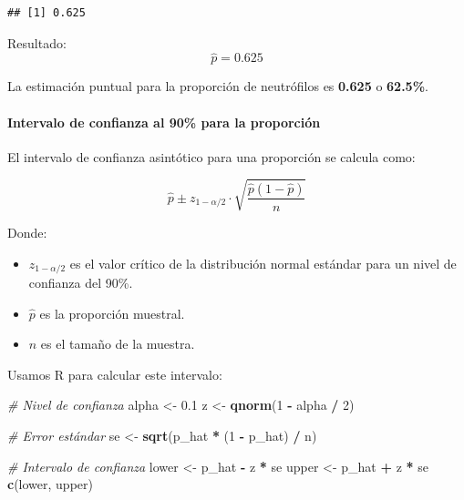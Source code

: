\documentclass[
]{article}
\newenvironment{Shaded}{\begin{snugshade}}{\end{snugshade}}
\newcommand{\CommentTok}[1]{\textcolor[rgb]{0.56,0.35,0.01}{\textit{#1}}}
\newcommand{\DecValTok}[1]{\textcolor[rgb]{0.00,0.00,0.81}{#1}}
\newcommand{\FloatTok}[1]{\textcolor[rgb]{0.00,0.00,0.81}{#1}}
\newcommand{\FunctionTok}[1]{\textcolor[rgb]{0.13,0.29,0.53}{\textbf{#1}}}
\newcommand{\NormalTok}[1]{#1}
\newcommand{\OtherTok}[1]{\textcolor[rgb]{0.56,0.35,0.01}{#1}}
\newcommand{\SpecialCharTok}[1]{\textcolor[rgb]{0.81,0.36,0.00}{\textbf{#1}}}
\providecommand{\tightlist}{%
  \setlength{\itemsep}{0pt}\setlength{\parskip}{0pt}}
\begin{document}
\begin{verbatim}
## [1] 0.625
\end{verbatim}

Resultado:
\[ \hat{p} = 0.625 \]

La estimación puntual para la proporción de neutrófilos es \textbf{0.625} o \textbf{62.5\%}.

\paragraph{Intervalo de confianza al 90\% para la proporción}\label{intervalo-de-confianza-al-90-para-la-proporciuxf3n}

El intervalo de confianza asintótico para una proporción se calcula como:

\[ \hat{p} \pm z_{1-\alpha/2} \cdot \sqrt{\frac{\hat{p}(1-\hat{p})}{n}} \]

Donde:

\begin{itemize}
\tightlist
\item
  \(z_{1-\alpha/2}\) es el valor crítico de la distribución normal estándar para un nivel de confianza del 90\%.
\item
  \(\hat{p}\) es la proporción muestral.
\item
  \(n\) es el tamaño de la muestra.
\end{itemize}

Usamos R para calcular este intervalo:

\begin{Shaded}
\begin{Highlighting}[]
\CommentTok{\# Nivel de confianza}
\NormalTok{alpha }\OtherTok{\textless{}{-}} \FloatTok{0.1}
\NormalTok{z }\OtherTok{\textless{}{-}} \FunctionTok{qnorm}\NormalTok{(}\DecValTok{1} \SpecialCharTok{{-}}\NormalTok{ alpha }\SpecialCharTok{/} \DecValTok{2}\NormalTok{)}

\CommentTok{\# Error estándar}
\NormalTok{se }\OtherTok{\textless{}{-}} \FunctionTok{sqrt}\NormalTok{(p\_hat }\SpecialCharTok{*}\NormalTok{ (}\DecValTok{1} \SpecialCharTok{{-}}\NormalTok{ p\_hat) }\SpecialCharTok{/}\NormalTok{ n)}

\CommentTok{\# Intervalo de confianza}
\NormalTok{lower }\OtherTok{\textless{}{-}}\NormalTok{ p\_hat }\SpecialCharTok{{-}}\NormalTok{ z }\SpecialCharTok{*}\NormalTok{ se}
\NormalTok{upper }\OtherTok{\textless{}{-}}\NormalTok{ p\_hat }\SpecialCharTok{+}\NormalTok{ z }\SpecialCharTok{*}\NormalTok{ se}
\FunctionTok{c}\NormalTok{(lower, upper)}
\end{Highlighting}
\end{Shaded}
\end{document}
